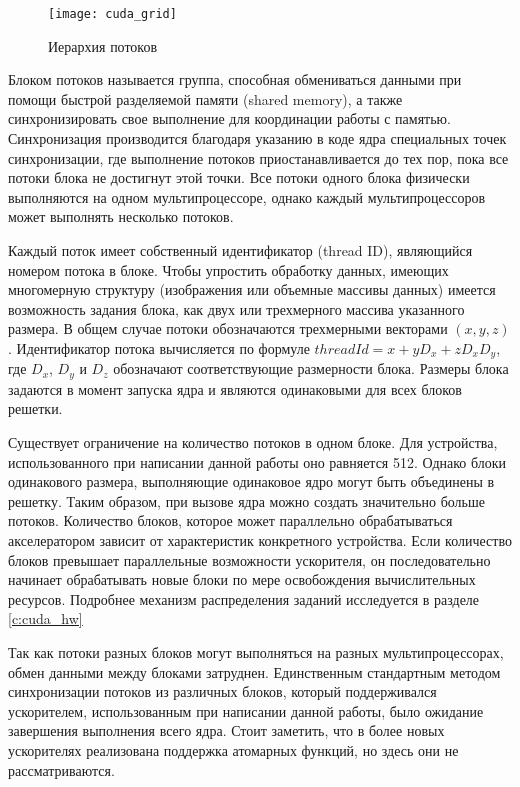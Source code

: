 \begin{figure}[ht]
\center
\texttt{[image: cuda\_grid]}
\caption{Иерархия потоков}
\label{fig:cuda_grid}
\end{figure}

Блоком потоков называется группа, способная обмениваться данными при помощи быстрой разделяемой памяти (shared memory), а также синхронизировать свое выполнение для координации работы с памятью. Синхронизация производится благодаря указанию в коде ядра специальных точек синхронизации, где выполнение потоков приостанавливается до тех пор, пока все потоки блока не достигнут этой точки. Все потоки одного блока физически выполняются на одном мультипроцессоре, однако каждый мультипроцессоров может выполнять несколько потоков.

Каждый поток имеет собственный идентификатор (thread ID), являющийся номером потока в блоке. Чтобы упростить обработку данных, имеющих многомерную структуру (изображения или объемные массивы данных) имеется возможность задания блока, как двух или трехмерного массива указанного размера. В общем случае потоки обозначаются трехмерными векторами $(x, y, z)$. Идентификатор потока вычисляется по формуле $threadId = x + yD_x + zD_xD_y$, где $D_x$, $D_y$ и $D_z$ обозначают соответствующие размерности блока. Размеры блока задаются в момент запуска ядра и являются одинаковыми для всех блоков решетки.
 
Существует ограничение на количество потоков в одном блоке. Для устройства, использованного при написании данной работы оно равняется 512. Однако блоки одинакового размера, выполняющие одинаковое ядро могут быть объединены в решетку. Таким образом, при вызове ядра можно создать значительно больше потоков. Количество блоков, которое может параллельно обрабатываться акселератором зависит от характеристик конкретного устройства. Если количество блоков превышает параллельные возможности ускорителя, он последовательно начинает обрабатывать новые блоки по мере освобождения вычислительных ресурсов. Подробнее механизм распределения заданий исследуется в разделе \ref{c:cuda_hw}

Так как потоки разных блоков могут выполняться на разных мультипроцессорах, обмен данными между блоками затруднен. Единственным стандартным методом синхронизации потоков из различных блоков, который поддерживался ускорителем, использованным при написании данной работы, было ожидание завершения выполнения всего ядра. Стоит заметить, что в более новых ускорителях реализована поддержка атомарных функций, но здесь они не рассматриваются.

